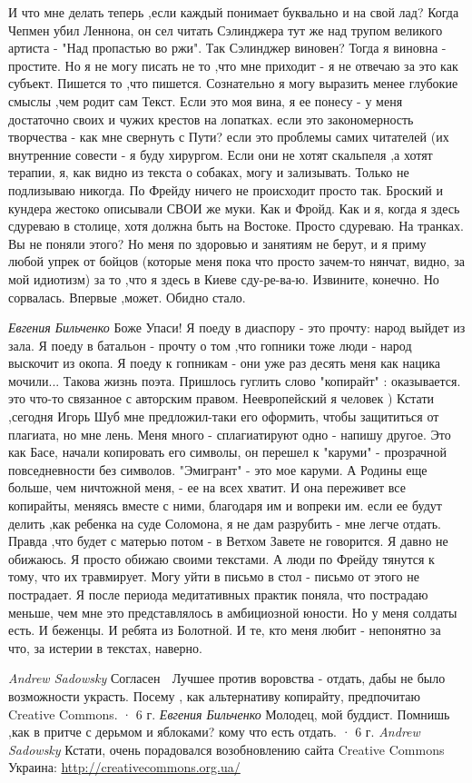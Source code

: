 И что мне делать теперь ,если каждый понимает буквально и на свой лад? Когда Чепмен убил Леннона, он сел читать Сэлинджера тут же над трупом великого артиста - "Над пропастью во ржи". Так Сэлинджер виновен? Тогда я виновна - простите. Но я не могу писать не то ,что мне приходит - я не отвечаю за это как субъект. Пишется то ,что пишется. Сознательно я могу выразить менее глубокие смыслы ,чем родит сам Текст. Если это моя вина, я ее понесу - у меня достаточно своих и чужих крестов на лопатках. если это закономерность творчества - как мне свернуть с Пути? если это проблемы самих читателей (их внутренние совести - я буду хирургом. Если они не хотят скальпеля ,а хотят терапии, я, как видно из текста о собаках, могу и зализывать. Только не подлизываю никогда. По Фрейду ничего не происходит просто так. Броский и кундера жестоко описывали СВОИ же муки. Как и Фройд. Как и я, когда я здесь сдуреваю в столице, хотя должна быть на Востоке. Просто сдуреваю. На транках. Вы не поняли этого? Но меня по здоровью и занятиям не берут, и я приму любой упрек от бойцов (которые меня пока что просто зачем-то нянчат, видно, за мой идиотизм) за то ,что я здесь в Киеве сду-ре-ва-ю. Извините, конечно. Но сорвалась. Впервые ,может. Обидно стало.

\emph{Евгения Бильченко}
Боже Упаси! Я поеду в диаспору - это прочту: народ выйдет из зала. Я поеду в батальон - прочту о том ,что гопники тоже люди - народ выскочит из окопа. Я поеду к гопникам - они уже раз десять меня как нацика мочили... Такова жизнь поэта. Пришлось гуглить слово "копирайт" : оказывается. это что-то связанное с авторским правом. Неевропейский я человек ) Кстати ,сегодня Игорь Шуб мне предложил-таки его оформить, чтобы защититься от плагиата, но мне лень. Меня много - сплагиатируют одно - напишу другое. Это как Басе, начали копировать его символы, он перешел к "каруми" - прозрачной повседневности без символов. "Эмигрант" - это мое каруми. А Родины еще больше, чем ничтожной меня, - ее на всех хватит. И она переживет все копирайты, меняясь вместе с ними, благодаря им и вопреки им. если ее будут делить ,как ребенка на суде Соломона, я не дам разрубить - мне легче отдать. Правда ,что будет с матерью потом - в Ветхом Завете не говорится. Я давно не обижаюсь. Я просто обижаю своими текстами. А люди по Фрейду тянутся к тому, что их травмирует. Могу уйти в письмо в стол - письмо от этого не пострадает. Я после периода медитативных практик поняла, что пострадаю меньше, чем мне это представлялось в амбициозной юности. Но у меня солдаты есть. И беженцы. И ребята из Болотной. И те, кто меня любит - непонятно за что, за истерии в текстах, наверно.

\emph{Andrew Sadowsky}
Согласен 🙂 Лучшее против воровства - отдать, дабы не было возможности украсть. Посему , как альтернативу копирайту, предпочитаю Creative Commons.
 · 6 г.
\emph{Евгения Бильченко}
Молодец, мой буддист. Помнишь ,как в притче с дерьмом и яблоками? кому что есть отдать.
 · 6 г.
\emph{Andrew Sadowsky}
Кстати, очень порадовался возобновлению сайта Creative Commons Украина: \url{http://creativecommons.org.ua/}
